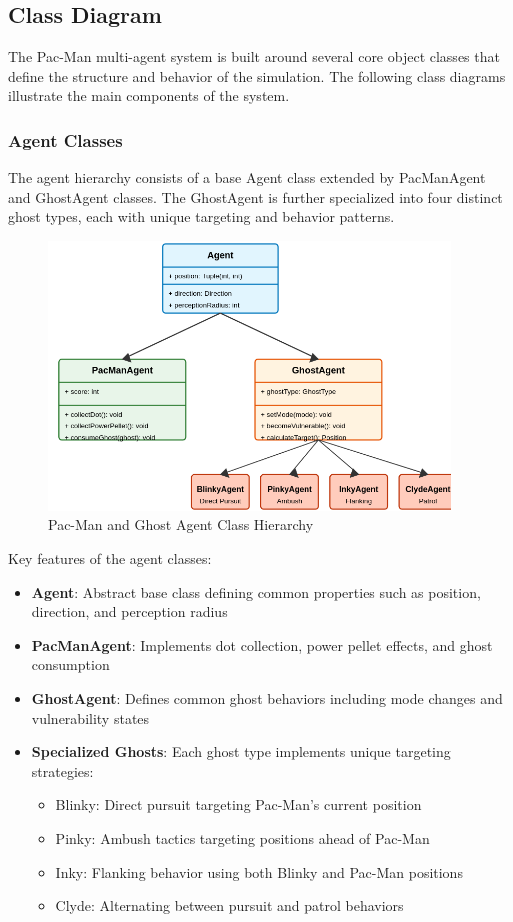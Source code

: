 \documentclass[a4paper, 11pt]{article}
\begin{document}
\clearpage

\subsection{Class Diagram}
The Pac-Man multi-agent system is built around several core object classes that define the structure and behavior of the simulation. The following class diagrams illustrate the main components of the system.

\subsubsection{Agent Classes}
The agent hierarchy consists of a base Agent class extended by PacManAgent and GhostAgent classes. The GhostAgent is further specialized into four distinct ghost types, each with unique targeting and behavior patterns.

\begin{figure}[h]
\centering
\includegraphics[width=0.95\textwidth]{agent-class-diagram.png}
\caption{Pac-Man and Ghost Agent Class Hierarchy}
\end{figure}

Key features of the agent classes:
\begin{itemize}
    \item \textbf{Agent}: Abstract base class defining common properties such as position, direction, and perception radius
    \item \textbf{PacManAgent}: Implements dot collection, power pellet effects, and ghost consumption
    \item \textbf{GhostAgent}: Defines common ghost behaviors including mode changes and vulnerability states
    \item \textbf{Specialized Ghosts}: Each ghost type implements unique targeting strategies:
    \begin{itemize}
        \item Blinky: Direct pursuit targeting Pac-Man's current position
        \item Pinky: Ambush tactics targeting positions ahead of Pac-Man
        \item Inky: Flanking behavior using both Blinky and Pac-Man positions
        \item Clyde: Alternating between pursuit and patrol behaviors
    \end{itemize}
\end{itemize}
\end{document}
